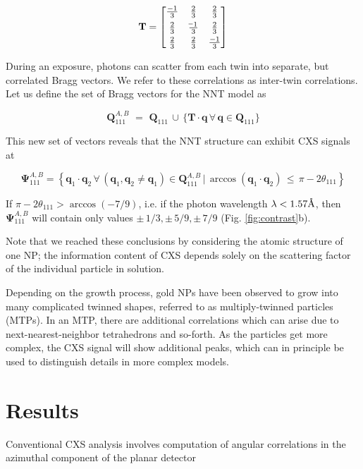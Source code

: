 \documentclass [12pt,fleqn]{article}
\newcommand*{\matminus}{%
  \leavevmode
  \hphantom{0}%
  \llap{%
    \settowidth{\dimen0 }{$0$}%
    \resizebox{1.1\dimen0 }{\height}{$-$}%
  }%
}
\newcommand{\angstrom}{\textup{\AA}}
\def \be {\begin{equation}}
\def \ee {\end{equation}}
\begin{document}
\be \label{twinmat}
\mathbf T = \begin{bmatrix}
       \frac{-1}{3} & \frac{2}{3} & \frac{2}{3}           \\[0.3em]
       \frac{2}{3} & \frac{\matminus 1}{3}           & \frac{2}{3} \\[0.3em]
       \frac{2}{3}           & \frac{2}{3} & \frac{-1}{3}
     \end{bmatrix}
\ee

During an exposure, photons can scatter from each twin into separate, but correlated Bragg vectors. We refer to these correlations as inter-twin correlations. Let us define the set of Bragg vectors for the NNT model as 

\be
\bm Q^{A,B}_{111}\,\, =\,\, \bm Q_{111} \, \cup \, \big \{  \mathbf T  \cdot \bm q \, \forall \, \bm q \in \bm Q_{111} \big \}
\ee

This new set of vectors reveals that the NNT structure can exhibit CXS signals at 

\be \label{psisetab}
\bm \Psi^{A,B}_{111} = \left \{  \bm q_1 \cdot \bm q_2  \, \forall \, (\bm q_1, \bm q_2 \ne \bm q_1) \in \bm Q^{A,B}_{111}\, \big | \,  \arccos ( \bm q_1\cdot  \bm q_2  ) \, \le \, \pi -   2\theta_{111}     \right \}
\ee

If $\pi - 2\theta_{111} > \arccos(-7/9)$, i.e. if the photon wavelength $\lambda < 1.57 \angstrom$, then $\bm \Psi^{A,B}_{111}$ will contain only values $\pm \,1/3, \pm \,5/9, \pm\, 7/9$ (Fig. \ref{fig:contrast}b).

Note that we reached these conclusions by considering the atomic structure of one NP; the information content of CXS depends solely on the scattering factor of the individual particle in solution.

Depending on the growth process, gold NPs have been observed to grow into many complicated twinned shapes, referred to as multiply-twinned particles (MTPs). In an MTP, there are additional correlations which can arise due to next-nearest-neighbor tetrahedrons and so-forth. As the particles get more complex, the CXS signal will show additional peaks, which can in principle be used to distinguish details in more complex models. 

\section{Results}
Conventional CXS analysis involves computation of angular correlations in the azimuthal component of the planar detector
\end{document}
